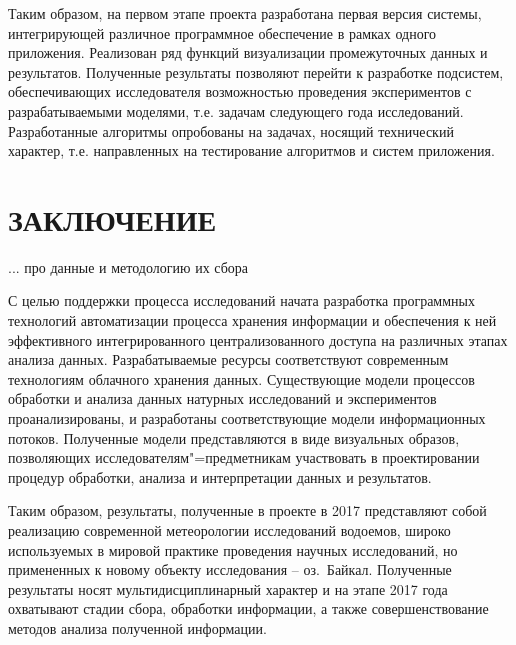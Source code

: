 \documentclass[a4paper,12pt,openany,final]{extreport}
\newcommand\theyear{2017}
\begin{document}
Таким образом, на первом этапе проекта разработана первая версия
системы, интегрирующей различное программное обеспечение в рамках одного
приложения. Реализован ряд функций визуализации промежуточных данных и
результатов. Полученные результаты позволяют перейти к разработке
подсистем, обеспечивающих исследователя возможностью проведения
экспериментов с разрабатываемыми моделями, т.е. задачам следующего года
исследований. Разработанные алгоритмы опробованы на задачах, носящий
технический характер, т.е. направленных на тестирование алгоритмов и
систем приложения.

\chapter*{ЗАКЛЮЧЕНИЕ}
\label{chap:concl}


... про данные и методологию их сбора

С целью поддержки процесса исследований начата разработка программных технологий автоматизации процесса хранения информации и обеспечения к ней эффективного интегрированного централизованного доступа на различных этапах анализа данных.  Разрабатываемые ресурсы соответствуют современным технологиям облачного хранения данных.  Существующие модели процессов обработки и анализа данных натурных исследований и экспериментов проанализированы, и разработаны соответствующие модели информационных потоков.  Полученные модели представляются в виде визуальных образов, позволяющих исследователям"=предметникам участвовать в проектировании процедур обработки, анализа и интерпретации данных и результатов.

Таким образом, результаты, полученные в проекте в \theyear{} представляют собой реализацию современной метеорологии исследований водоемов, широко используемых в мировой практике проведения научных исследований, но примененных к новому объекту исследования -- оз.~Байкал.  Полученные результаты носят мультидисциплинарный характер и на этапе \theyear{} года охватывают стадии сбора, обработки информации, а также совершенствование методов анализа полученной информации.

\appendices
\end{document}
